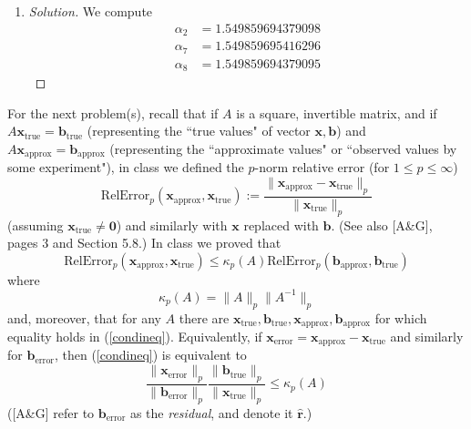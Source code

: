 \documentclass{article}
\begin{document}
\begin{enumerate}
\begin{proof}[Solution]
		From the theorem from class,
		there is a unique degree at most $2$ polynomial that passes
		through the three points
		$(0,g(0)), (1,g(1)), (2,g(2))$.
		$g$ is a degree at most $2$ polynomial that passes through all those points.
		Also $0$ is a polynomial of degree at most $2$ that passes through all the points.
		Hence, $g(y) = 0$ by uniqueness.
		Hence, $0 = g(1/2) =
		q(2 + \cdot 10^{-6}/2) - r(2 + \cdot 10^{-7}/2) = \alpha_6 - \alpha_7
		\implies \alpha_6 = \alpha_7$.
	\end{proof}
	\item \begin{proof}[Solution]\let\qed\relax
		We compute
		\begin{align*}
			\alpha_2 &= 1.549859694379098\\
			\alpha_7 &= 1.549859695416296\\
			\alpha_8 &= 1.549859694379095
		\end{align*}
	\end{proof}
\end{enumerate}


For the next problem(s), recall that if $A$ is a square, invertible matrix,
and if $A\mathbf{x}_{\text{true}} = \mathbf{b}_{\text{true}}$
(representing the ``true values" of vector $\mathbf{x},\mathbf{b}$)
and $A\mathbf{x}_{\text{approx}} = \mathbf{b}_{\text{approx}}$
(representing the ``approximate values" or ``observed values by some experiment"),
in class we defined the $p$-norm relative error (for $1 \leq p \leq \infty$)
\begin{equation}
	\mathrm{RelError}_p(\mathbf{x}_{\text{approx}},\mathbf{x}_{\text{true}})
	:= \frac{\lVert \mathbf{x}_{\text{approx}} - \mathbf{x}_{\text{true}}\rVert_p}
	{\lVert \mathbf{x}_{\text{true}}\rVert_p}
\end{equation}
(assuming $\mathbf{x}_{\text{true}} \neq \mathbf{0}$)
and similarly with $\mathbf{x}$ replaced with $\mathbf{b}$.
(See also [A\&G], pages 3 and Section 5.8.)
In class we proved that
\begin{equation}\label{condineq}
	\mathrm{RelError}_p(\mathbf{x}_{\text{approx}},\mathbf{x}_{\text{true}})
	\leq \kappa_p(A)\mathrm{RelError}_p(\mathbf{b}_{\text{approx}},\mathbf{b}_{\text{true}})
\end{equation}
where
\[
	\kappa_p(A) = \lVert A \rVert_p\lVert A^{-1} \rVert_p
\]
and, moreover, that for any $A$ there are
$\mathbf{x}_{\text{true}},\mathbf{b}_{\text{true}},
\mathbf{x}_{\text{approx}}, \mathbf{b}_{\text{approx}}$
for which equality holds in (\ref{condineq}).
Equivalently, if $\mathbf{x}_{\text{error}} =
\mathbf{x}_{\text{approx}} - \mathbf{x}_{\text{true}}$
and similarly for $\mathbf{b}_{\text{error}}$, then (\ref{condineq}) is equivalent to
\begin{equation}\label{condineq2}
	\frac{\lVert \mathbf{x}_{\text{error}}\rVert_p}{\lVert \mathbf{b}_{\text{error}} \rVert_p}
	\frac{\lVert \mathbf{b}_{\text{true}}\rVert_p}{\lVert \mathbf{x}_{\text{true}} \rVert_p}
	\leq \kappa_p(A)
\end{equation}
([A\&G] refer to $\mathbf{b}_{\text{error}}$ as the \emph{residual}, and denote
it $\hat{\mathbf{r}}$.)
\end{document}
